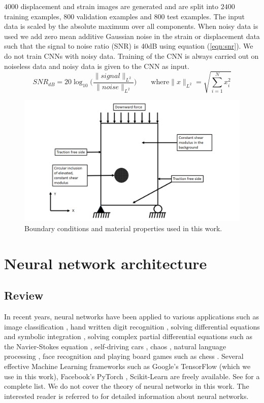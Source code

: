 \documentclass[12pt]{article}
\begin{document}
$4000$ displacement and strain images are generated and are split into $2400$ training examples, $800$ validation examples and $800$ test examples. The input data is scaled by the absolute maximum over all components. When noisy data is used we add zero mean additive Gaussian noise in the strain or displacement data such that the signal to noise ratio (SNR) is 40dB using equation (\ref{eqn:snr}). We do not train CNNs with noisy data. Training of the CNN is always carried out on noiseless data and noisy data is given to the CNN as input. 
\begin{equation}
  \label{eqn:snr}
  SNR_{dB} = 20\log_{10}\Big(\frac{\|signal\|_{L^2}}{\|noise\|_{L^2}}\Big) \qquad \text{where} \|x\|_{L^2} = \sqrt{\sum_{i=1}^{N}x_i^2} 
\end{equation}
%
\begin{figure}[h] 
   \centering
    \includegraphics[totalheight=9cm]{Figures/bc.png}
  \caption{\label{fig:bc}Boundary conditions and material properties used in this work. }
\end{figure}
%
\section{Neural network architecture}
\subsection{Review}
In recent years, neural networks have been applied to various applications such as image classification \cite{paper:hinton2017}, hand written digit recognition \cite{paper:kulkarni2018}, solving differential equations and symbolic integration \cite{misc:lample2019}, solving complex partial differential equations such as the Navier-Stokes equation \cite{misc:anandkumar2020}, self-driving cars \cite{misc:agnihotri2019,misc:nvidiaselfdriving2016}, chaos \cite{paper:pathak2018}, natural language processing \cite{misc:googlenlp}, face recognition \cite{conf:taigman2014} and playing board games such as chess \cite{paper:alphazero}. Several effective Machine Learning frameworks such as Google's TensorFlow \cite{misc:tensorflow} (which we use in this work), Facebook's PyTorch \cite{incollect:pytorch}, Scikit-Learn \cite{paper:scikit-learn} are freely available. See \cite{misc:compdeep} for a complete list. We do not cover the theory of neural networks in this work. The interested reader is referred to \cite{book:aggarwal,book:goodfellow,book:chollet,misc:cs231n,misc:andrewng,misc:udemy} for detailed information about neural networks.
\end{document}

